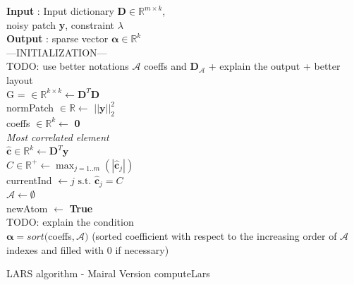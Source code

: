 \documentclass{ipol}
\newcommand{\psize}{m}
\newcommand{\dsize}{k}
\newcommand{\dict}{\textbf{D}}
\newcommand{\code}{\bm{\alpha}}
\newcommand{\noi}{\textbf{y}}
\newcommand{\da}{\bm{D}_{\mathcal{A}}}
\newcommand{\clars}{\hat{\textbf{c}}}
\newcommand{\A}{\mathcal{A}}
\newcommand{\RR}{\mathbb{R}}
\begin{document}
\begin{algorithm}[H]

\SetLine
\textbf{Input} : Input dictionary $\dict \in \mathbb{R}^{\psize \times \dsize}$,\\
noisy patch \textbf{\noi}, 
constraint $\lambda$\\
\textbf{Output} : sparse vector $\code \in \mathbb{R}^{\dsize}$\\
---INITIALIZATION---\\
{\color{blue} TODO: use better notations $\A$ coeffs and $\da$ + explain the output + better layout}\\
G = $\in \mathbb{R}^{\dsize \times \dsize} \leftarrow \dict^T\dict$\\
normPatch $\in \mathbb{R} \leftarrow$ $||\noi||^2_2$\\
coeffs $\in \mathbb{R}^{\dsize} \leftarrow$ \textbf{0}\\
\textit{Most correlated element}\\
$\clars \in \RR^{\dsize} \leftarrow \dict^T \noi$\\
$C \in \RR^+ \leftarrow \max_{j=1..\psize}(|\clars_j|)$ \\
currentInd $\leftarrow j \text{ s.t. } \clars_j = C$\\
$\A \leftarrow \emptyset $\\
newAtom $\leftarrow$ \textbf{True}\\
{\color{blue} TODO: explain the condition}\\
\For{ i = 1..$\dsize$}{
LOOP !!!
}
\Return $\code = sort($coeffs$, \A)$ (sorted coefficient with respect to the increasing order of $\A$ indexes and filled with 0 if necessary)
	
\caption{LARS algorithm - Mairal Version {\color{red} computeLars}}

\end{algorithm}

\newpage
\end{document}
